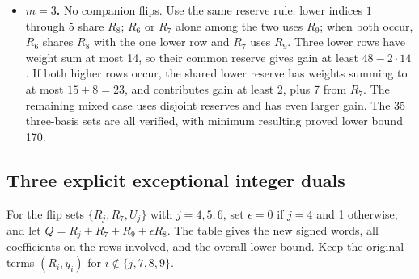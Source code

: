 \documentclass[
  11pt,
]{article}
\begin{document}
\begin{itemize}
  This is the whole list of harmful companion changes: each of the 21
  pairs has two designated companions except that \(U_7\) is
  sorted-positive for the six pairs containing \(R_7\). Hence there are
  \(42-6=36\) exact obligations in this subfamily; an unrelated extra
  flip leaves the already verified radius-two dual untouched.
\item
  \textbf{\(m=3\).} No companion flips. Use the same reserve rule: lower
  indices \(1\) through \(5\) share \(R_8\); \(R_6\) or \(R_7\) alone
  among the two uses \(R_9\); when both occur, \(R_6\) shares \(R_8\)
  with the one lower row and \(R_7\) uses \(R_9\). Three lower rows have
  weight sum at most 14, so their common reserve gives gain at least
  \(48-2\cdot14\). If both higher rows occur, the shared lower reserve
  has weights summing to at most \(15+8=23\), and contributes gain at
  least 2, plus 7 from \(R_7\). The remaining mixed case uses disjoint
  reserves and has even larger gain. The 35 three-basis sets are all
  verified, with minimum resulting proved lower bound 170.
\end{itemize}

\subsection{Three explicit exceptional integer
duals}\label{three-explicit-exceptional-integer-duals}

For the flip sets \(\{R_j,R_7,U_j\}\) with \(j=4,5,6\), set
\(\epsilon=0\) if \(j=4\) and 1 otherwise, and let
\(Q=R_j+R_7+R_9+\epsilon R_8\). The table gives the new signed words,
all coefficients on the rows involved, and the overall lower bound. Keep
the original terms \((R_i,y_i)\) for \(i\notin\{j,7,8,9\}\).
\end{document}
